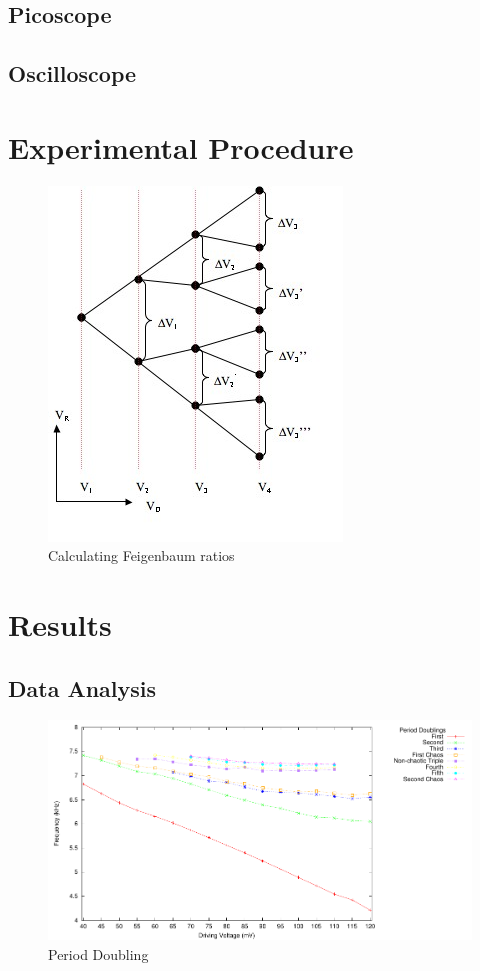 \documentclass[12pt]{report}
\begin{document}
\section{Picoscope}
\label{sec:Picoscope}


\section{Oscilloscope}
\label{sec:Oscilloscope}


\chapter{Experimental Procedure}


	\begin{figure}
		\centering
		\includegraphics{Pics/BifurcationDiagram.jpg}
		\caption{Calculating Feigenbaum ratios}
		\label{fig: Calculating Feigenbaum ratios}
	\end{figure}
\chapter{Results}

\section{Data Analysis} %
\label{sec:Data Analysis}

	\begin{figure}[h]
		\centering
		\includegraphics{plots/general.pdf}
		\caption{Period Doubling}
		\label{fig:periodDoubling}
	\end{figure}
\end{document}
